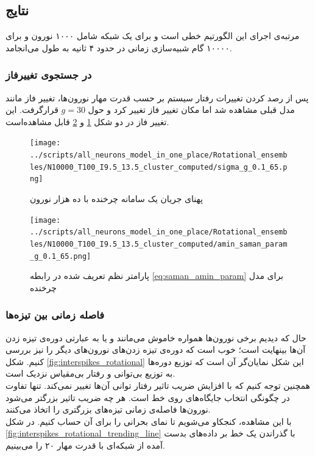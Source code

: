 \documentclass[12pt,onecolumn,a4paper]{article}
\begin{document}
\subsection{نتایج }
مرتبه‌ی اجرای این الگورتیم خطی است و برای یک شبکه شامل ۱۰۰۰ نورون و برای ۱۰۰۰۰ گام شبیه‌سازی زمانی در حدود ۴ ثانیه به طول می‌انجامد. 


\subsubsection{در جستجوی تغییرفاز}
پس از رصد کردن تغییرات رفتار سیستم بر حسب قدرت مهار نورون‌ها، تغییر فاز مانند مدل قبلی مشاهده شد اما مکان تغییر فاز تغییر کرد و حول $g=30$ قرارگرفت. این تغییر فاز در دو شکل \ref{fig:sigma_rotational} و \ref{fig:amin_saman_rotational}  قابل مشاهده‌است.
\begin{figure}
\centering
  \texttt{[image: ../scripts/all\_neurons\_model\_in\_one\_place/Rotational\_ensembles/N10000\_T100\_I9.5\_13.5\_cluster\_computed/sigma\_g\_0.1\_65.png]}
 \caption{پهنای جریان یک سامانه چرخنده با ده هزار نورون}
  \label{fig:sigma_rotational}
\end{figure}

\begin{figure}
\centering
  \texttt{[image: ../scripts/all\_neurons\_model\_in\_one\_place/Rotational\_ensembles/N10000\_T100\_I9.5\_13.5\_cluster\_computed/amin\_saman\_param\_g\_0.1\_65.png]}
 \caption{پارامتر نظم تعریف شده در رابطه \ref{eq:saman_amin_param} برای مدل چرخنده }
  \label{fig:amin_saman_rotational}
\end{figure}


\subsubsection{فاصله زمانی بین تیزه‌ها}
حال که دیدیم برخی نورون‌ها همواره خاموش می‌مانند و یا به عبارتی دوره‌ی تیزه زدن آن‌ها بینهایت است؛ خوب است که دوره‌ی تیزه زدن‌های نورون‌های دیگر را نیز بررسی کنیم. شکل \ref{fig:interspikes_rotational} این شکل نمایان‌گر آن است که توزیع دوره‌ها به توزیع بی‌توانی و رفتار بی‌مقیاس نزدیک است.\\
همچنین توجه کنیم که با افزایش ضریب تاثیر رفتار توانی آن‌ها تغییر نمی‌کند. تنها تفاوت در چگونگی انتخاب جایگاه‌های روی خط است. هر چه ضریب تاثیر بزرگتر می‌شود نورون‌ها فاصله‌ی زمانی تیزه‌های بزرگتری را اتخاذ می‌کنند.
\\
با این مشاهده، کنجکاو می‌شویم تا نمای بحرانی را برای آن حساب کنیم. در شکل \ref{fig:interspikes_rotational_trending_line} با گذراندن یک خط بر داده‌های بدست آمده از شبکه‌ای با قدرت مهار ۲۰ را می‌بینیم.
\end{document}
